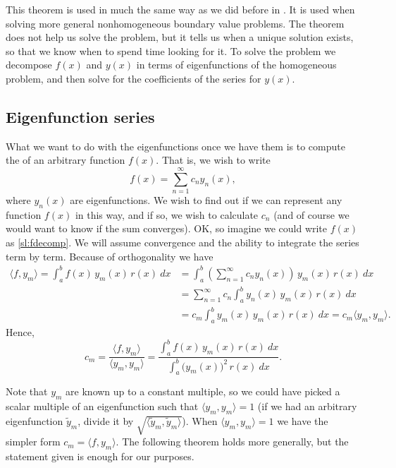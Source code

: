 This theorem is used in much the same way as we did before in
.  It is used when solving more general nonhomogeneous
boundary value problems.  The theorem does not help us solve the problem, but
it tells us when a unique solution exists, so
that we know when to spend time looking for it.  To solve the problem
we decompose $f(x)$ and $y(x)$ in terms of eigenfunctions of the
homogeneous
problem, and then solve for the coefficients of the series for $y(x)$.

\subsection{Eigenfunction series}

What we want to do with the eigenfunctions once we have them is to
compute the \emph{} of an arbitrary
function $f(x)$.  That is, we wish to write
\begin{equation} \label{sl:fdecomp}
f(x) = \sum_{n=1}^\infty c_n y_n(x) ,
\end{equation}
where $y_n(x)$ are eigenfunctions.
We wish to find out if we can represent
any function $f(x)$ in this way,
and if so, we wish to calculate $c_n$ (and of course we would want to know if
the sum converges).  OK\@, so imagine
we could write $f(x)$ as \eqref{sl:fdecomp}.  We will assume convergence and
the ability to integrate the series term by term.
Because of orthogonality we have
\begin{equation*}
\begin{split}
\langle f , y_m \rangle
 = \int_a^b f(x) \, y_m (x) \, r(x) ~ dx
& = \int_a^b \left( \sum_{n=1}^\infty c_n y_n(x) \right) \, y_m (x) \, r(x) ~ dx\\
&= \sum_{n=1}^\infty c_n \int_a^b y_n(x) \, y_m (x) \, r(x) ~ dx\\
&= c_m \int_a^b y_m(x) \, y_m (x) \, r(x) ~ dx = c_m \langle y_m , y_m \rangle
.
\end{split}
\end{equation*}
Hence,
\begin{equation} \label{sl:cm}
\boxed{~~
c_m = \frac{\langle f , y_m \rangle}{\langle y_m , y_m \rangle}
=
\frac{\int_a^b f(x) \, y_m (x)\, r(x) ~ dx}%
{\int_a^b {\bigl(y_m(x)\bigr)}^2 \, r(x) ~dx} .
~~}
\end{equation}

Note that $y_m$ are known up to a constant multiple, so we could have picked
a scalar multiple of an eigenfunction such that
$\langle y_m , y_m \rangle = 1$ (if we had an arbitrary eigenfunction
$\tilde{y}_m$, divide it
by $\sqrt{\langle \tilde{y}_m , \tilde{y}_m \rangle}$).
When
$\langle y_m , y_m \rangle = 1$
we have the
simpler form $c_m = \langle f, y_m \rangle$.
The following theorem holds
more generally, but the statement given is enough for our purposes.

